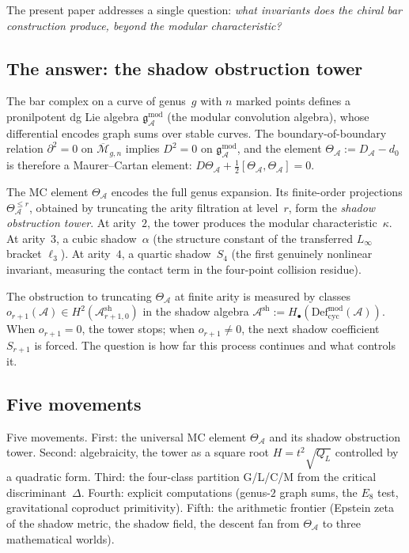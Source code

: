 \documentclass[11pt,reqno]{amsart}
\theoremstyle{definition}
\theoremstyle{remark}
\newcommand{\cA}{\mathcal{A}}
\newcommand{\cM}{\mathcal{M}}
\newcommand{\Defcyc}{\mathrm{Def}_{\mathrm{cyc}}}
\newcommand{\gmod}{\mathfrak{g}^{\mathrm{mod}}_\cA}
\numberwithin{equation}{section}
\begin{document}
The present paper addresses a single question: \emph{what
invariants does the chiral bar construction produce, beyond the
modular characteristic?}

\subsection{The answer: the shadow obstruction tower}

The bar complex on a curve of genus~$g$ with $n$ marked points
defines a pronilpotent dg Lie algebra $\gmod$ (the modular
convolution algebra), whose differential encodes graph sums over
stable curves. The boundary-of-boundary relation
$\partial^2 = 0$ on $\overline{\cM}_{g,n}$ implies $D^2 = 0$ on
$\gmod$, and the element $\Theta_\cA := D_\cA - d_0$ is
therefore a Maurer--Cartan element:
$D \Theta_\cA + \frac{1}{2}[\Theta_\cA, \Theta_\cA] = 0$.

The MC element $\Theta_\cA$ encodes the full genus expansion.
Its finite-order projections $\Theta_\cA^{\le r}$, obtained by
truncating the arity filtration at level~$r$, form the
\emph{shadow obstruction tower}. At arity~$2$, the tower
produces the modular characteristic~$\kappa$. At arity~$3$,
a cubic shadow~$\alpha$ (the structure constant of the transferred
$L_\infty$ bracket $\ell_3$). At arity~$4$, a quartic
shadow~$S_4$ (the first genuinely nonlinear invariant, measuring
the contact term in the four-point collision residue).

The obstruction to truncating $\Theta_\cA$ at finite arity is
measured by classes
$o_{r+1}(\cA) \in H^2(\cA^{\mathrm{sh}}_{r+1,0})$ in the
shadow algebra $\cA^{\mathrm{sh}} := H_\bullet(\Defcyc^{\mathrm{mod}}(\cA))$.
When $o_{r+1} = 0$, the tower stops; when $o_{r+1} \ne 0$, the
next shadow coefficient $S_{r+1}$ is forced. The question is
how far this process continues and what controls it.

\subsection{Five movements}

Five movements. First: the universal MC element $\Theta_\cA$
and its shadow obstruction tower. Second: algebraicity, the tower
as a square root $H = t^2\sqrt{Q_L}$ controlled by a quadratic form.
Third: the four-class partition G/L/C/M from the critical
discriminant~$\Delta$. Fourth: explicit computations (genus-$2$
graph sums, the $E_8$ test, gravitational coproduct primitivity).
Fifth: the arithmetic frontier (Epstein zeta of the shadow metric,
the shadow field, the descent fan from $\Theta_\cA$ to three
mathematical worlds).
\end{document}
